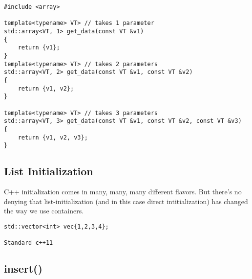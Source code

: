 \documentclass[openany]{report}
\begin{document}
\begin{verbatim}
#include <array>

template<typename> VT> // takes 1 parameter
std::array<VT, 1> get_data(const VT &v1)
{
    return {v1};
}
template<typename> VT> // takes 2 parameters
std::array<VT, 2> get_data(const VT &v1, const VT &v2)
{
    return {v1, v2};
}

template<typename> VT> // takes 3 parameters
std::array<VT, 3> get_data(const VT &v1, const VT &v2, const VT &v3)
{
    return {v1, v2, v3};
}
\end{verbatim}

\subsection{List Initialization}

C++ initialization comes in many, many, many different flavors. 
But there's no denying that list-initialization (and in this case direct intitialization) has changed the way we use containers.

\begin{verbatim}
std::vector<int> vec{1,2,3,4};

Standard c++11
\end{verbatim}

\subsection{insert()}
\end{document}
